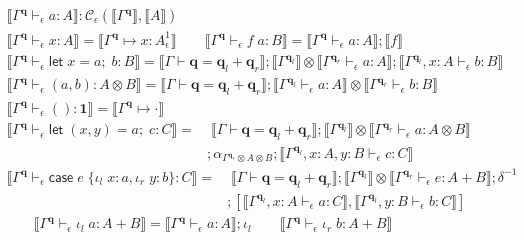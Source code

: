 \documentclass[acmsmall,screen,review]{acmart}
\newcommand{\mc}[1]{\ensuremath{\mathcal{#1}}}
\newcommand{\mb}[1]{\ensuremath{\mathbf{#1}}}
\newcommand{\ms}[1]{\ensuremath{\mathsf{#1}}}
\newcommand{\lto}{:}
\newcommand{\linl}[1]{\iota_l\;{#1}}
\newcommand{\linr}[1]{\iota_r\;{#1}}
\newcommand{\letexpr}[3]{\ensuremath{\ms{let}\;#1 = #2;\;#3}}
\newcommand{\caseexpr}[5]{\ms{case}\;#1\;\{\linl{#2} \lto #3, \linr{#4} \lto #5\}}
\newcommand{\qsp}[4]{#1 \vdash #2 = #3 + #4}
\newcommand{\cwk}[2]{#1 \mapsto #2}
\newcommand{\hasty}[4]{#1 \vdash_{#2} #3: {#4}}
\newcommand{\dnt}[1]{\llbracket{#1}\rrbracket}
\newcommand{\oneq}{1}
\begin{document}
\begin{figure}
  \begin{gather*}
    \boxed{\dnt{\hasty{\Gamma^{\mb{q}}}{\epsilon}{a}{A}} 
      : \mc{C}_\epsilon(\dnt{\Gamma^{\mb{q}}}, \dnt{A})} \\
    \dnt{\hasty{\Gamma^{\mb{q}}}{\epsilon}{x}{A}} 
      = \dnt{\cwk{\Gamma^{\mb{q}}}{x : A^\oneq_\epsilon}}
    \qquad
    \dnt{\hasty{\Gamma^{\mb{q}}}{\epsilon}{f\;a}{B}} 
      = \dnt{\hasty{\Gamma^{\mb{q}}}{\epsilon}{a}{A}} ; \dnt{f} \\
    \dnt{\hasty{\Gamma^{\mb{q}}}{\epsilon}{\letexpr{x}{a}{b}}{B}} 
      = \dnt{\qsp{\Gamma}{\mb{q}}{\mb{q}_l}{\mb{q}_r}}
      ; \dnt{\Gamma^{\mb{q}_l}} 
        \otimes \dnt{\hasty{\Gamma^{\mb{q}_r}}{\epsilon}{a}{A}}
      ; \dnt{\hasty{\Gamma^{\mb{q}_l}, x : A}{\epsilon}{b}{B}}
    \\
    \dnt{\hasty{\Gamma^{\mb{q}}}{\epsilon}{(a, b)}{A \otimes B}}
      = \dnt{\qsp{\Gamma}{\mb{q}}{\mb{q}_l}{\mb{q}_r}}
      ; \dnt{\hasty{\Gamma^{\mb{q}_l}}{\epsilon}{a}{A}}
      \otimes \dnt{\hasty{\Gamma^{\mb{q}_r}}{\epsilon}{b}{B}}
    \\
    \dnt{\hasty{\Gamma^{\mb{q}}}{\epsilon}{()}{\mb{1}}}
      = \dnt{\cwk{\Gamma^{\mb{q}}}{\cdot}}
  \end{gather*}
  \begin{align*}
    \dnt{\hasty{\Gamma^{\mb{q}}}{\epsilon}{\letexpr{(x, y)}{a}{c}}{C}}
    = & \; \dnt{\qsp{\Gamma}{\mb{q}}{\mb{q}_l}{\mb{q}_r}}
      ; \dnt{\Gamma^{\mb{q}_l}}
      \otimes \dnt{\hasty{\Gamma^{\mb{q}_r}}{\epsilon}{a}{A \otimes B}}
    \\ & 
    ; \alpha_{\Gamma^{\mb{q}_r} \otimes A \otimes B}
    ; \dnt{\hasty{\Gamma^{\mb{q}_l}, x : A, y : B}{\epsilon}{c}{C}}
  \end{align*}
  \begin{align*}
    \dnt{\hasty{\Gamma^{\mb{q}}}{\epsilon}{\caseexpr{e}{x}{a}{y}{b}}{C}}
    =& \; 
    \dnt{\qsp{\Gamma}{\mb{q}}{\mb{q}_l}{\mb{q}_r}}
    ; \dnt{\Gamma^{\mb{q}_l}} 
    \otimes \dnt{\hasty{\Gamma^{\mb{q}_r}}{\epsilon}{e}{A + B}}
    ; \delta^{-1} \\ & 
    ; [
      \dnt{\hasty{\Gamma^{\mb{q}_l}, x : A}{\epsilon}{a}{C}},
      \dnt{\hasty{\Gamma^{\mb{q}_l}, y : B}{\epsilon}{b}{C}}
    ]
  \end{align*}
  \begin{gather*}
    \dnt{\hasty{\Gamma^{\mb{q}}}{\epsilon}{\linl{a}}{A + B}}
    = \dnt{\hasty{\Gamma^{\mb{q}}}{\epsilon}{a}{A}} ; \iota_l \qquad
    \dnt{\hasty{\Gamma^{\mb{q}}}{\epsilon}{\linr{b}}{A + B}}

\end{gather*}
\end{figure}
\end{document}
